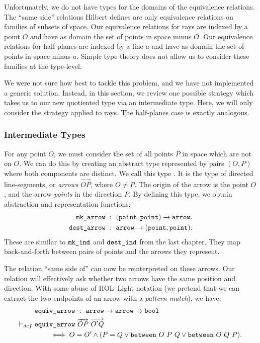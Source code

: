 Unfortunately, we do not have types for the domains of the equivalence relations. The ``same side'' relations Hilbert defines are only equivalence relations on families of subsets of space. Our equivalence relations for rays are indexed by a point $O$ and have as domain the set of points in space minus $O$. Our equivalence relations for half-planes are indexed by a line $a$ and have as domain the set of points in space minus $a$. Simple type theory does not allow us to consider these families at the type-level.

We were not sure how best to tackle this problem, and we have not implemented a generic solution. Instead, in this section, we review one possible strategy which takes us to our new quotiented type via an intermediate type. Here, we will only consider the strategy applied to rays. The half-planes case is exactly analogous.

\subsubsection{Intermediate Types}
For any point $O$, we must consider the set of all points $P$ in space which are not on $O$. We can do this by creating an abstract type represented by pairs $(O,P)$ where both components are distinct. We call this type . It is the type of directed line-segments, or \emph{arrows} $\overrightarrow{OP}$, where $O \neq P$. The origin of the arrow is the point $O$, and the arrow \emph{points} in the direction $P$. By defining this type, we obtain abstraction and representation functions:
\begin{align*}
  \code{mk\_arrow}\ &:\ (\code{point},\code{point})\rightarrow\code{arrow}.\\
  \code{dest\_arrow}\ &:\ \code{arrow}\rightarrow(\code{point},\code{point}).
  \end{align*}
These are similar to $\texttt{mk\_ind}$ and $\texttt{dest\_ind}$ from the last chapter. They map back-and-forth between pairs of points and the arrows they represent.

The relation ``same side of'' can now be reinterpreted on these arrows. Our relation will effectively ask whether two arrows have the same position and direction. With some abuse of HOL~Light notation (we pretend that we can extract the two endpoints of an arrow with a \emph{pattern match}), we have:
\begin{equation}\label{eq:EquivArrowDef}
  \begin{split}
    &\code{equiv\_arrow}\ :\ \code{arrow} \rightarrow \code{arrow}\rightarrow \code{bool}\\
    \vdash_{def}\; &\code{equiv\_arrow}\ \overrightarrow{OP}\ \overrightarrow{O'Q}\\
    &\qquad\iff O = O' \wedge (P = Q \vee \between{O}{P}{Q} \vee \between{O}{Q}{P}).
  \end{split}
\end{equation}

